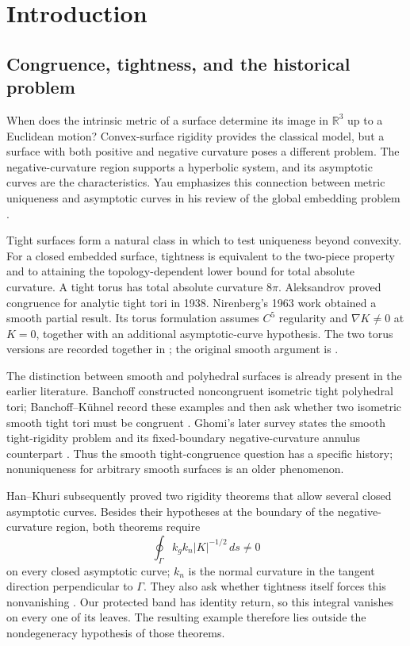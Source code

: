 \documentclass[11pt]{amsart}
\theoremstyle{definition}
\theoremstyle{remark}
\newcommand{\R}{\mathbb R}\newcommand{\Sph}{\mathbb S}
\numberwithin{equation}{section}
\begin{document}
\section{Introduction}\label{sec:intro}
\subsection{Congruence, tightness, and the historical problem}
When does the intrinsic metric of a surface determine its image in
$\R^3$ up to a Euclidean motion? Convex-surface rigidity provides the
classical model, but a surface with both positive and negative curvature
poses a different problem. The negative-curvature region supports a
hyperbolic system, and its asymptotic curves are the characteristics.
Yau emphasizes this connection between metric uniqueness and asymptotic
curves in his review of the global embedding problem
\cite[pp.~235--236]{YauReview}.

Tight surfaces form a natural class in which to test uniqueness beyond
convexity. For a closed embedded surface, tightness is equivalent to the
two-piece property and to attaining the topology-dependent lower bound
for total absolute curvature. A tight torus has total absolute curvature
$8\pi$. Aleksandrov proved congruence for analytic tight tori
in 1938. Nirenberg's 1963 work obtained a smooth partial result.
Its torus formulation assumes $C^5$ regularity and $\nabla K\ne0$ at
$K=0$, together with an additional asymptotic-curve hypothesis. The two
torus versions are recorded together in \cite[Theorem~1.6.1]{BK}; the original
smooth argument is \cite{Nirenberg}.

The distinction between smooth and polyhedral surfaces is already
present in the earlier literature. Banchoff constructed noncongruent
isometric tight polyhedral tori; Banchoff--K\"uhnel record these examples
and then ask whether two isometric smooth tight tori must be congruent
\cite[Example~1.6.2 and Question~11]{BK}. Ghomi's later survey states
the smooth tight-rigidity problem and its fixed-boundary
negative-curvature annulus counterpart \cite[Problems~1.2--1.3]{GhomiProblems}.
Thus the smooth tight-congruence question has a specific history;
nonuniqueness for arbitrary smooth surfaces is an older phenomenon.

Han--Khuri subsequently proved two rigidity theorems that allow several
closed asymptotic curves. Besides their hypotheses at the boundary of
the negative-curvature region, both theorems require
\[
 \oint_\Gamma k_gk_n|K|^{-1/2}\,ds\ne0
\]
on every closed asymptotic curve; $k_n$ is the normal curvature in the
tangent direction perpendicular to $\Gamma$. They also ask whether
tightness itself forces this nonvanishing \cite[Theorems~1--2 and the
following remark]{HK}. Our protected band has identity return, so this
integral vanishes on every one of its leaves. The resulting example
therefore lies outside the nondegeneracy hypothesis of those theorems.
\end{document}
